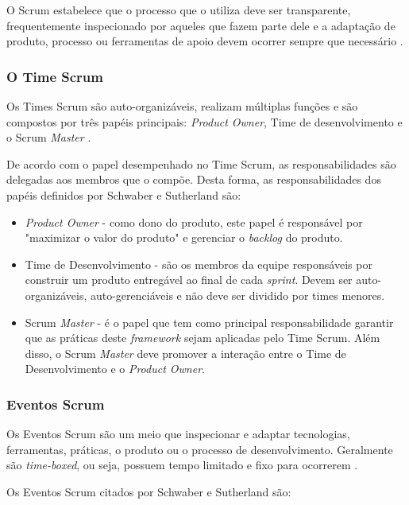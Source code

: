 O Scrum estabelece que o processo que o utiliza deve ser transparente, frequentemente inspecionado por aqueles que fazem parte dele e a adaptação de produto, processo ou ferramentas de apoio devem ocorrer sempre que necessário \cite{schwaber_guia_2013}.

\subsubsection{O Time Scrum}
Os Times Scrum são auto-organizáveis, realizam múltiplas funções e são compostos por três papéis principais: \textit{Product Owner}, Time de desenvolvimento e o Scrum \textit{Master} \cite{schwaber_guia_2013}.

De acordo com o papel desempenhado no Time Scrum, as responsabilidades são delegadas aos membros que o compõe. Desta forma, as responsabilidades dos papéis definidos por Schwaber e Sutherland \cite{schwaber_guia_2013} são:

\begin{itemize}
\item \textit{Product Owner} - como dono do produto, este papel é responsável por "maximizar o valor do produto" e gerenciar o \textit{backlog} do produto.

\item Time de Desenvolvimento - são os membros da equipe responsáveis por construir um produto entregável ao final de cada \textit{sprint}. Devem ser auto-organizáveis, auto-gerenciáveis e não deve ser dividido por times menores.

\item Scrum \textit{Master} - é o papel que tem como principal responsabilidade garantir que as práticas deste \textit{framework} sejam aplicadas pelo Time Scrum. Além disso, o Scrum \textit{Master} deve promover a interação entre o Time de Desenvolvimento e o \textit{Product Owner}.

\end{itemize}
\subsubsection{Eventos Scrum}
Os Eventos Scrum são um meio que inspecionar e adaptar tecnologias, ferramentas, práticas, o produto ou o processo de desenvolvimento. Geralmente são \textit{time-boxed}, ou seja, possuem tempo limitado e fixo para ocorrerem \cite{schwaber_guia_2013}.

Os Eventos Scrum citados por Schwaber e Sutherland \cite{schwaber_guia_2013} são:

